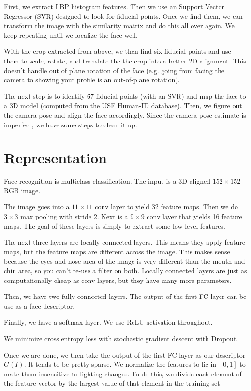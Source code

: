 \documentclass[a4paper]{article}
\begin{document}
First, we extract LBP histogram features. Then we use an Support Vector 
Regressor (SVR) designed to look for fiducial points. Once we find them,
we can transform the image with the similarity matrix and do this all over 
again. We keep repeating until we localize the face well.

With the crop extracted from above, we then find six fiducial points and use
them to scale, rotate, and translate the the crop into a better 2D alignment.
This doesn't handle out of plane rotation of the face (e.g. going from facing
the camera to showing your profile is an out-of-plane rotation).

The next step is to identify 67 fiducial points (with an SVR) and map the
face to a 3D model (computed from the USF Human-ID database). Then, we figure
out the camera pose and align the face accordingly. Since the camera pose 
estimate is imperfect, we have some steps to clean it up.

\section{Representation}
Face recognition is multiclass classification. The input is a 3D aligned
$152 \times 152$ RGB image.

The image goes into a $11 \times 11$ conv layer to yield 32 feature maps. Then
we do $3 \times 3$ max pooling with stride 2. Next is a $9 \times 9$ conv layer
that yields 16 feature maps. The goal of these layers is simply to extract
some low level features.

The next three layers are locally connected layers. This means they apply
feature maps, but the feature maps are different across the image. This makes
sense because the eyes and nose area of the image is very different than the
mouth and chin area, so you can't re-use a filter on both. Locally connected 
layers are just as computationally cheap as conv layers, but they have many
more parameters.

Then, we have two fully connected layers. The output of the first FC layer can 
be use as a face descriptor.

Finally, we have a softmax layer. We use ReLU activation throughout.

We minimize cross entropy loss with stochastic gradient descent with Dropout.

Once we are done, we then take the output of the first FC layer as our
descriptor $G(I)$. It tends to be pretty sparse. We normalize the features
to lie in $[0, 1]$ to make them insensitive to lighting changes. To do this,
we divide each element of the feature vector by the largest value of that 
element in the training set:
\end{document}
